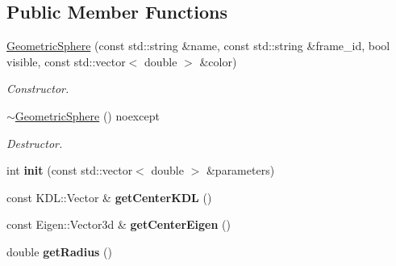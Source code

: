 \subsection*{Public Member Functions}
\begin{DoxyCompactItemize}
\item 
\hypertarget{classhiqp_1_1GeometricSphere_a90d723ef1578fbbe680a4935fbbecb14}{\hyperlink{classhiqp_1_1GeometricSphere_a90d723ef1578fbbe680a4935fbbecb14}{Geometric\-Sphere} (const std\-::string \&name, const std\-::string \&frame\-\_\-id, bool visible, const std\-::vector$<$ double $>$ \&color)}\label{classhiqp_1_1GeometricSphere_a90d723ef1578fbbe680a4935fbbecb14}

\begin{DoxyCompactList}\small\item\em Constructor. \end{DoxyCompactList}\item 
\hypertarget{classhiqp_1_1GeometricSphere_a1b57cf041716a7431215868fd5e43a95}{\hyperlink{classhiqp_1_1GeometricSphere_a1b57cf041716a7431215868fd5e43a95}{$\sim$\-Geometric\-Sphere} () noexcept}\label{classhiqp_1_1GeometricSphere_a1b57cf041716a7431215868fd5e43a95}

\begin{DoxyCompactList}\small\item\em Destructor. \end{DoxyCompactList}\item 
\hypertarget{classhiqp_1_1GeometricSphere_a3eefc7ade4208eda8ce06377ba897f03}{int {\bfseries init} (const std\-::vector$<$ double $>$ \&parameters)}\label{classhiqp_1_1GeometricSphere_a3eefc7ade4208eda8ce06377ba897f03}

\item 
\hypertarget{classhiqp_1_1GeometricSphere_aefcb62cd6bd44184a34f2802f5d3333b}{const K\-D\-L\-::\-Vector \& {\bfseries get\-Center\-K\-D\-L} ()}\label{classhiqp_1_1GeometricSphere_aefcb62cd6bd44184a34f2802f5d3333b}

\item 
\hypertarget{classhiqp_1_1GeometricSphere_a505e75434cc62b8c5ee001346bd1a609}{const Eigen\-::\-Vector3d \& {\bfseries get\-Center\-Eigen} ()}\label{classhiqp_1_1GeometricSphere_a505e75434cc62b8c5ee001346bd1a609}

\item 
\hypertarget{classhiqp_1_1GeometricSphere_a1101c636602bf29d616e56feffdc1612}{double {\bfseries get\-Radius} ()}\label{classhiqp_1_1GeometricSphere_a1101c636602bf29d616e56feffdc1612}


\end{DoxyCompactItemize}
